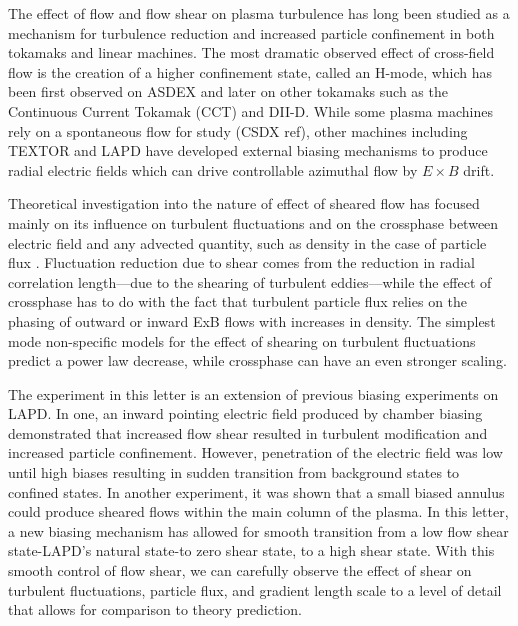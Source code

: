 \documentclass[%
 aps,
 prl,
 amsmath,amssymb,
 reprint,%
]{revtex4-1}
\begin{document}
\maketitle


	The effect of flow and flow shear on plasma turbulence has long been studied as a mechanism for turbulence reduction and increased particle confinement in both tokamaks and linear machines.  The most dramatic observed effect of cross-field flow is the creation of a higher confinement state, called an H-mode, which has been first observed on ASDEX\cite{wagner82} and later on other tokamaks such as the Continuous Current Tokamak (CCT)\cite{taylor89,tynan92} and DII-D\cite{groebner90,moyer95}. While some plasma machines rely on a spontaneous flow for study (CSDX ref), other machines including TEXTOR\cite{boedo00} and LAPD\cite{maggs07,carter09} have developed external biasing mechanisms to produce radial electric fields which can drive controllable azimuthal flow by $E \times B$ drift\cite{weynants93}.
	
Theoretical investigation into the nature of effect of sheared flow has focused mainly on its influence on turbulent fluctuations \cite{biglari90} and on the crossphase between electric field and any advected quantity, such as density in the case of particle flux \cite{ware96,terry01}. Fluctuation reduction due to shear comes from the reduction in radial correlation length---due to the shearing of turbulent eddies---while the effect of crossphase has to do with the fact that turbulent particle flux relies on the phasing of outward or inward ExB flows with increases in density. The simplest mode non-specific models for the effect of shearing on turbulent fluctuations predict a power law decrease\cite{biglari90}, while crossphase can have an even stronger scaling\cite{terry01}.

The experiment in this letter is an extension of previous biasing experiments on LAPD. In one, an inward pointing electric field produced by chamber biasing demonstrated that increased flow shear resulted in turbulent modification and increased particle confinement\cite{carter09}. However, penetration of the electric field was low until high biases resulting in sudden transition from background states to confined states. In another experiment, it was shown that a small biased annulus could produce sheared flows within the main column of the plasma\cite{zhou12}. In this letter, a new biasing mechanism has allowed for smooth transition from a low flow shear state-LAPD's natural state-to zero shear state, to a high shear state. With this smooth control of flow shear, we can carefully observe the effect of shear on turbulent fluctuations, particle flux, and gradient length scale to a level of detail that allows for comparison to theory prediction.
\end{document}
